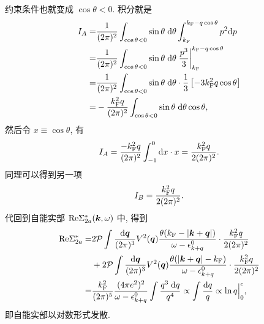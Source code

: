 约束条件也就变成 $\cos\theta<0$. 积分就是 
 \begin{align}
        I_A=&\frac{1}{(2\pi)^2}\int_{\cos\theta<0}\sin\theta\;\mathrm{d}\theta\int_{k_{\mathrm{F}}}^{k_{\mathrm{F}}-q\cos\theta}p^2\mathrm{d} p\nonumber\\
        =&\frac{1}{(2\pi)^2}\int_{\cos\theta<0}\sin\theta\;\mathrm{d}\theta\left.\frac{p^3}{3}\right|_{k_{\mathrm{F}}}^{k_{\mathrm{F}}-q\cos\theta}\nonumber\\
        =&\frac{1}{(2\pi)^2}\int_{\cos\theta<0}\sin\theta\;\mathrm{d}\theta\cdot\frac{1}{3}\left[ -3 k_{\mathrm{F}}^2q\cos\theta \right]\nonumber\\
        =&-\frac{k_{\mathrm{F}}^2q}{(2\pi)^2}\int_{\cos\theta<0}\sin\theta\;\mathrm{d}\theta\cos\theta,
    \end{align}
然后令 $x\equiv \cos\theta$, 有 
\begin{equation}
    I_A=\frac{-k_{\mathrm{F}}^2q}{(2\pi)^2}\int_{-1}^0\mathrm{d} x\cdot x=\frac{k_{\mathrm{F}}^2q}{2(2\pi)^2}.
\end{equation}
同理可以得到另一项 
\begin{equation}
    I_B=\frac{k_{\mathrm{F}}^2q}{2(2\pi)^2}.
\end{equation}
代回到自能实部 $\mathrm{Re}\Sigma_{2a}^*(\boldsymbol{k},\omega)$ 中, 得到 
 \begin{align}
        \mathrm{Re}\Sigma_{2a}^*=&2\mathcal{P}\int\frac{\mathrm{d}\boldsymbol{q}}{(2\pi)^3}V^2(\boldsymbol{q})\frac{\theta(k_{\mathrm{F}}-|\boldsymbol{k}+\boldsymbol{q}|)}{\omega-\epsilon_{k+q}^0}\cdot \frac{k_{\mathrm{F}}^2 q}{2(2\pi)^2}\nonumber\\
        &+2\mathcal{P}\int\frac{\mathrm{d}\boldsymbol{q}}{(2\pi)^3}V^2(\boldsymbol{q})\frac{\theta(|\boldsymbol{k}+\boldsymbol{q}|-k_{\mathrm{F}})}{\omega-\epsilon_{k+q}^0}\cdot \frac{k_{\mathrm{F}}^2q}{2(2\pi)^2}\nonumber\\
        =&\frac{k_{\mathrm{F}}^2}{(2\pi)^5}\frac{(4\pi e^2)^2}{\omega-\epsilon_{k+q}^0}\int\frac{q^3\;\mathrm{d} q}{q^4}\propto \int\frac{\mathrm{d} q}{q}\propto\ln q\Big|_0^c,
    \end{align}
即自能实部以对数形式发散. 

